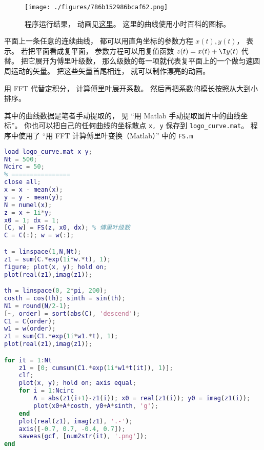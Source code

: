 
\begin{issues}
\issueDraft
\end{issues}


\begin{figure}[ht]
\centering
\texttt{[image: ./figures/786b152986bcaf62.png]}
\caption{程序运行结果， 动画见\href{https://wuli.wiki/apps/FFTplt.html}{这里}。 这里的曲线使用小时百科的图标。} \label{fig_FFTdrw_1}
\end{figure}

平面上一条任意的连续曲线， 都可以用直角坐标的参数方程 $x(t), y(t)$， 表示。 若把平面看成复平面， 参数方程可以用复值函数 $z(t) = x(t) + \I y(t)$ 代替。 把它展开为傅里叶级数， 那么级数的每一项就代表复平面上的一个做匀速圆周运动的矢量。 把这些矢量首尾相连， 就可以制作漂亮的动画。

用 FFT 代替定积分， 计算傅里叶展开系数。 然后再把系数的模长按照从大到小排序。

其中的曲线数据是笔者手动提取的， 见 “用 Matlab 手动提取图片中的曲线坐标”。 你也可以把自己的任何曲线的坐标散点 \verb|x, y| 保存到 \verb|logo_curve.mat|。 程序中使用了 “用 FFT 计算傅里叶变换（Matlab）” 中的 \verb|FS.m|

\begin{lstlisting}[language=matlab, caption=FFTplt.m]
% ==== 参数设置 ====
load logo_curve.mat x y;
Nt = 500;
Ncirc = 50;
% ================
close all;
x = x - mean(x);
y = y - mean(y);
N = numel(x);
z = x + 1i*y;
x0 = 1; dx = 1;
[C, w] = FS(z, x0, dx); % 傅里叶级数
C = C(:); w = w(:);

t = linspace(1,N,Nt);
z1 = sum(C.*exp(1i*w.*t), 1);
figure; plot(x, y); hold on;
plot(real(z1),imag(z1));

th = linspace(0, 2*pi, 200);
costh = cos(th); sinth = sin(th);
N1 = round(N/2-1);
[~, order] = sort(abs(C), 'descend');
C1 = C(order);
w1 = w(order);
z1 = sum(C1.*exp(1i*w1.*t), 1);
plot(real(z1),imag(z1));

for it = 1:Nt
    z1 = [0; cumsum(C1.*exp(1i*w1*t(it)), 1)];
    clf;
    plot(x, y); hold on; axis equal;
    for i = 1:Ncirc
        A = abs(z1(i+1)-z1(i)); x0 = real(z1(i)); y0 = imag(z1(i));
        plot(x0+A*costh, y0+A*sinth, 'g');
    end
    plot(real(z1), imag(z1), '.-');
    axis([-0.7, 0.7, -0.4, 0.7]);
    saveas(gcf, [num2str(it), '.png']);
end
\end{lstlisting}
